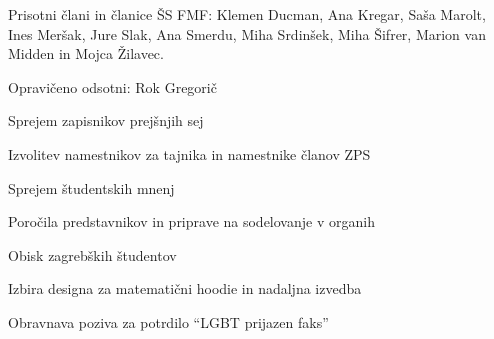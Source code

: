 \documentclass{seja}
\begin{document}
Prisotni člani in članice ŠS FMF: Klemen Ducman, Ana Kregar, Saša Marolt, Ines
Meršak, Jure Slak, Ana Smerdu, Miha Srdinšek, Miha Šifrer, Marion van Midden in
Mojca Žilavec.

Opravičeno odsotni: Rok Gregorič

\begin{red*}
\item Sprejem zapisnikov prejšnjih sej
\item Izvolitev namestnikov za tajnika in namestnike članov ZPS
\item Sprejem študentskih mnenj
\item Poročila predstavnikov in priprave na sodelovanje v organih
\item Obisk zagrebških študentov
\item Izbira designa za matematični hoodie in nadaljna izvedba
\item Obravnava poziva za potrdilo ``LGBT prijazen faks''
\end{red*}
\end{document}
